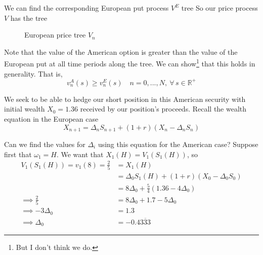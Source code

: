 \documentclass[12pt]{article}
\newlength\tindent
\renewcommand{\indent}{\hspace*{\tindent}}
\newcommand{\R}{\mathbb R}
\begin{document}
\indent We can find the corresponding European put process $V^E$ tree
So our price process $V$ has the tree
\begin{figure}[H]
\centering
{}
\caption{European price tree $V_n$}
\end{figure}

\indent Note that the value of the American option is greater than the value of the European put at all time periods along the tree. We can show\footnote{But I don't think we do.} that this holds in generality. That is,
\begin{equation*}
	v^A_n(s) \geq v^E_n(s) \quad n = 0,...,N,~\forall\,s\in\R^+
\end{equation*}

\indent We seek to be able to hedge our short position in this American security with initial wealth $X_0 = 1.36$ received by our position's proceeds. Recall the wealth equation in the European case
\begin{equation*}
	X_{n + 1} = \Delta_nS_{n + 1} + (1 + r)(X_n - \Delta_nS_n)
\end{equation*}

\indent Can we find the values for $\Delta_i$ using this equation for the American case? Suppose first that $\omega_1 = H$. We want that $X_1(H) = V_1(S_1(H))$, so
\begin{align*}
	V_1(S_1(H)) = v_1(8) = \frac{2}{5} &= X_1(H) \\
	 &= \Delta_0S_1(H) + (1 + r)(X_0 - \Delta_0S_0) \\
	 &= 8\Delta_0 + \frac{5}{4}(1.36 - 4\Delta_0) \\
	\implies \frac{2}{5} &= 8\Delta_0 + 1.7 - 5\Delta_0 \\
	\implies -3\Delta_0 &= 1.3 \\
	\implies \Delta_0 &= -0.4\overline{333}
\end{align*}
\end{document}
